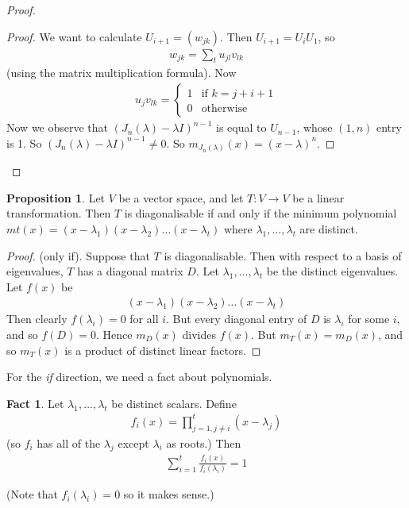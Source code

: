 \documentclass{article}
\theoremstyle{definition} \newtheorem*{definition}{Definition}
\newtheorem{proposition}[theorem]{Proposition}
\newtheorem*{fact}{Fact}
\newcommand{\mt}{m_T}
\begin{document}
\begin{proof}
\begin{proof}
    We want to calculate $U_{i+1}=\left( w_{jk} \right)$. Then
    $U_{i+1}=U_iU_1$, so 
    \begin{align*}
      w_{jk}=\sum_{t}^{}u_{jl}v_{lk}
    \end{align*}
    (using the matrix multiplication formula). Now
    \begin{align*}
      u_jv_{lk}  = 
      \begin{cases}
        1 & \text{if } k = j+i+1\\
        0& \text{otherwise}
      \end{cases}
    \end{align*}
    Now we observe that $\left( J_n(\lambda)-\lambda I \right)^{n-1}$
    is equal to $U_{n-1}$, whose $(1,n)$ entry is 1. So 
    $\left( J_n(\lambda)-\lambda I \right)^{n-1} \neq 0$. So
    $m_{J_n(\lambda)}(x)=(x-\lambda)^n$.
  \end{proof}
\end{proof}

\begin{proposition}
  Let $V$ be a vector space, and let $T:V \rightarrow V$ be a linear
  transformation. Then $T$ is diagonalisable if and only if the 
  minimum polynomial $mt(x)=(x-\lambda_1)(x-\lambda_2)\dots
  (x-\lambda_t)$ where $\lambda_1,\dots,\lambda_t$ are distinct.
  \label{prp:tdiag}
\end{proposition}

\begin{proof}
  (only if). Suppose that $T$ is diagonalisable. Then with respect to
  a basis of eigenvalues, $T$ has a diagonal matrix $D$. Let
  $\lambda_1,\dots,\lambda_t$ be the distinct eigenvalues. Let $f(x)$
  be
  \begin{align*}
    (x-\lambda_1)(x-\lambda_2)\dots(x-\lambda_t)
  \end{align*}
  Then clearly $f(\lambda_i)=0$ for all $i$. But every diagonal
  entry of $D$ is $\lambda_i$ for some $i$, and so $f(D)=0$.
  Hence $m_D(x)$ divides $f(x)$. But $\mt(x)=m_D(x)$, and so
  $\mt(x)$ is a product of distinct linear factors.
\end{proof}

For the \textit{if} direction, we need a fact about polynomials.
\begin{fact}
  Let $\lambda_1,\dots,\lambda_t$ be distinct scalars. Define
  \begin{align*}
    f_i(x)=\prod_{j=1,j\neq i }^t (x-\lambda_j)
  \end{align*}
  (so $f_i$ has all of the $\lambda_j$ except $\lambda_i$ as roots.) Then
  \begin{align*}
    \sum_{i=1}^{t}\frac{f_i(x)}{f_i(\lambda_i)}=1
  \end{align*}

  (Note that $f_i(\lambda_i)=0$ so it makes sense.)
\end{fact}
\end{document}
